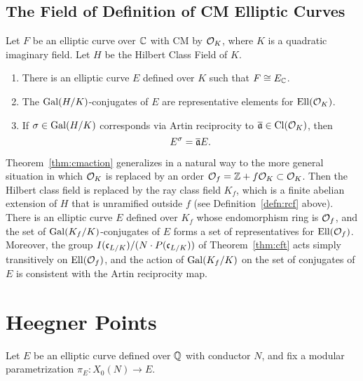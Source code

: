 \subsection{The Field of Definition of CM Elliptic Curves}\label{sec:cmfield}
\begin{theorem}\label{thm:cmaction}
Let $F$ be an elliptic curve over $\mathbb{C}$
with CM by $\mathcal{O}_K$, where $K$ is a quadratic
imaginary field.  Let $H$ be the Hilbert
Class Field of $K$.  
\begin{enumerate}
\item There is an elliptic
curve $E$ defined over $K$ such that $F\cong E_{\mathbb{C}}$.
\item The $\operatorname{Gal}(H/K)$-conjugates
of $E$ are representative elements for $\operatorname{Ell}(\mathcal{O}_K)$.
\item If $\sigma \in \operatorname{Gal}(H/K)$ corresponds via
Artin reciprocity to $\overline{\mathfrak{a}}\in \operatorname{Cl}(\mathcal{O}_K)$, then
$$
  E^{\sigma} = \overline{\mathfrak{a}} E.
$$
\end{enumerate}
\end{theorem}

Theorem~\ref{thm:cmaction} generalizes in a natural way to the
more general situation in which $\mathcal{O}_K$ is replaced by an order $\mathcal{O}_f =
\mathbb{Z} + f\mathcal{O}_K \subset\mathcal{O}_K$.  Then the Hilbert class field is replaced by
the ray class field $K_f$, which is a finite abelian extension of $H$
that is unramified outside $f$ (see Definition~\ref{defn:rcf} above). 
There is an elliptic curve $E$ defined
over $K_f$ whose endomorphism ring is $\mathcal{O}_f$, and the set of
$\operatorname{Gal}(K_f/K)$-conjugates of $E$ forms a set of representatives for
$\operatorname{Ell}(\mathcal{O}_f)$.  Moreover, the group
$I(\mathfrak{c}_{L/K})/(N\cdot P(\mathfrak{c}_{L/K}))$
of Theorem~\ref{thm:cft}
acts simply transitively on
$\operatorname{Ell}(\mathcal{O}_f)$, and the action of $\operatorname{Gal}(K_f/K)$ on the set of
conjugates of $E$ is consistent with the Artin reciprocity map.


\newpage
\section{Heegner Points}
Let $E$ be an elliptic curve defined over $\mathbb{Q}$ with conductor $N$,
and fix a modular parametrization $\pi_E:X_0(N) \to E$.  

